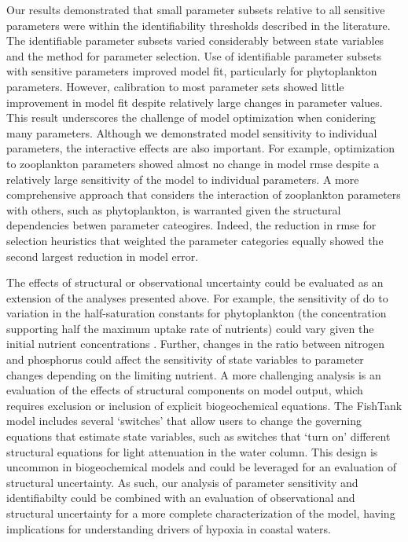 \documentclass[review]{elsarticle}\usepackage[]{graphicx}\usepackage[]{color}
\begin{document}
Our results demonstrated that small parameter subsets relative to all sensitive parameters were within the identifiability thresholds described in the literature.  The identifiable parameter subsets varied considerably between state variables and the method for parameter selection.  Use of identifiable parameter subsets with sensitive parameters improved model fit, particularly for phytoplankton parameters.  However, calibration to most parameter sets showed little improvement in model fit despite relatively large changes in parameter values.  This result underscores the challenge of model optimization when conidering many parameters.  Although we demonstrated model sensitivity to individual parameters, the interactive effects are also important.  For example, optimization to zooplankton parameters showed almost no change in model \ac{rmse} despite a relatively large sensitivity of the model to individual parameters.  A more comprehensive approach that considers the interaction of zooplankton parameters with others, such as phytoplankton, is warranted given the structural dependencies betwen parameter cateogires.  Indeed, the reduction in \ac{rmse} for selection heuristics that weighted the parameter categories equally showed the second largest reduction in model error.  

The effects of structural or observational uncertainty could be evaluated as an extension of the analyses presented above. For example, the sensitivity of \ac{do} to variation in the half-saturation constants for phytoplankton (the concentration supporting half the maximum uptake rate of nutrients) could vary given the initial nutrient concentrations \citep{Eppley69}. Further, changes in the ratio between nitrogen and phosphorus could affect the sensitivity of state variables to parameter changes depending on the limiting nutrient.  A more challenging analysis is an evaluation of the effects of structural components on model output, which requires exclusion or inclusion of explicit biogeochemical equations. The FishTank model includes several `switches' that allow users to change the governing equations that estimate state variables, such as switches that `turn on' different structural equations for light attenuation in the water column.  This design is uncommon in biogeochemical models and could be leveraged for an evaluation of structural uncertainty. As such, our analysis of parameter sensitivity and identifiabilty could be combined with an evaluation of observational and structural uncertainty for a more complete characterization of the model, having implications for understanding drivers of hypoxia in coastal waters.  
\end{document}
